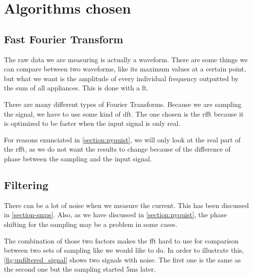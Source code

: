 \section{Algorithms chosen}
\subsection{Fast Fourier Transform}
The raw data we are measuring is actually a waveform. There are some things we can compare between two waveforms, like its maximum values at a certain point, but what we want is the amplitude of every individual frequency outputted by the sum of all appliances. This is done with a \acrshort{ft}.

There are many different types of Fourier Transforms. Because we are sampling the signal, we have to use some kind of \acrshort{dft}. The one chosen is the \acrshort{rfft} because it is optimized to be faster when the input signal is only real.

For reasons enunciated in \autoref{section:nyquist}, we will only look at the real part of the \acrshort{rfft}, as we do not want the results to change because of the difference of phase between the sampling and the input signal.

\subsection{Filtering}
There can be a lot of noise when we measure the current. This has been discussed in \autoref{section-smps}. Also, as we have discussed in \autoref{section:nyquist}, the phase shifting for the sampling may be a problem in some cases.

The combination of those two factors makes the \acrshort{fft} hard to use for comparison between two sets of sampling like we would like to do. In order to illustrate this, \autoref{fig:unfiltered_signal} shows two signals with noise. The first one is the same as the second one but the sampling started 5ms later. 

